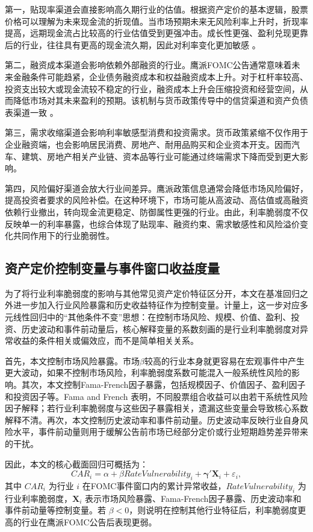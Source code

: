 \documentclass[UTF8,zihao=-4]{ctexart}
\begin{document}
第一，贴现率渠道会直接影响高久期行业的估值。根据资产定价的基本逻辑，股票价格可以理解为未来现金流的折现值。当市场预期未来无风险利率上升时，折现率提高，远期现金流占比较高的行业估值受到更强冲击。成长性更强、盈利兑现更靠后的行业，往往具有更高的现金流久期，因此对利率变化更加敏感 \citep{cochrane2005asset}。

第二，融资成本渠道会影响依赖外部融资的行业。鹰派FOMC公告通常意味着未来金融条件可能趋紧，企业债务融资成本和权益融资成本上升。对于杠杆率较高、投资支出较大或现金流较不稳定的行业，融资成本上升会压缩投资和经营空间，从而降低市场对其未来盈利的预期。该机制与货币政策传导中的信贷渠道和资产负债表渠道一致 \citep{mishkin1996channels,bernanke1995inside}。

第三，需求收缩渠道会影响利率敏感型消费和投资需求。货币政策紧缩不仅作用于企业融资端，也会影响居民消费、房地产、耐用品购买和企业资本开支。因而汽车、建筑、房地产相关产业链、资本品等行业可能通过终端需求下降而受到更大影响。

第四，风险偏好渠道会放大行业间差异。鹰派政策信息通常会降低市场风险偏好，提高投资者要求的风险补偿。在这种环境下，市场可能从高波动、高估值或高融资依赖行业撤出，转向现金流更稳定、防御属性更强的行业。由此，利率脆弱度不仅反映单一的利率暴露，也综合体现了贴现率、融资约束、需求敏感性和风险溢价变化共同作用下的行业脆弱性。

\subsection{资产定价控制变量与事件窗口收益度量}

为了将行业利率脆弱度的影响与其他常见资产定价特征区分开，本文在基准回归之外进一步加入行业风险暴露和历史收益特征作为控制变量。计量上，这一步对应多元线性回归中的“其他条件不变”思想：在控制市场风险、规模、价值、盈利、投资、历史波动和事件前动量后，核心解释变量的系数刻画的是行业利率脆弱度对异常收益的条件相关或偏效应，而不是简单相关关系。

首先，本文控制市场风险暴露。市场$\beta$较高的行业本身就更容易在宏观事件中产生更大波动，如果不控制市场风险，利率脆弱度系数可能混入一般系统性风险的影响。其次，本文控制Fama-French因子暴露，包括规模因子、价值因子、盈利因子和投资因子等。Fama and French \citep{fama1993common,fama2015five} 表明，不同股票组合收益可以由若干系统性风险因子解释；若行业利率脆弱度与这些因子暴露相关，遗漏这些变量会导致核心系数解释不清。再次，本文控制历史波动率和事件前动量。历史波动率反映行业自身风险水平，事件前动量则用于缓解公告前市场已经部分定价或行业短期趋势差异带来的干扰。

因此，本文的核心截面回归可概括为：
\[
CAR_i=\alpha+\beta RateVulnerability_i+\boldsymbol{\gamma}'\mathbf{X}_i+\varepsilon_i,
\]
其中 $CAR_i$ 为行业 $i$ 在FOMC事件窗口内的累计异常收益，$RateVulnerability_i$ 为行业利率脆弱度，$\mathbf{X}_i$ 表示市场风险暴露、Fama-French因子暴露、历史波动率和事件前动量等控制变量。若 $\beta<0$，则说明在控制其他行业特征后，利率脆弱度更高的行业在鹰派FOMC公告后表现更弱。
\end{document}
